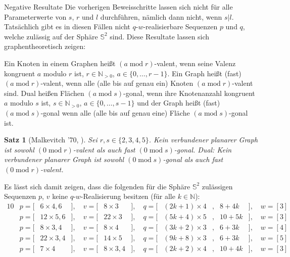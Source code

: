\documentclass[10pt, notheorems]{beamer}
\newtheorem{theorem}{Satz}[section]
\newcommand{\set}[1]{\{ #1 \}}
\newcommand{\nats}{\mathbb{N}}
\newcommand{\sphere}{\mathbb{S}}
\renewcommand{\mod}{\operatorname{mod}}
\newcommand{\hdef}[1]{\textcolor{darkred2}{#1}}
\begin{document}
\begin{frame}{Negative Resultate}
  Die vorherigen Beweisschritte lassen sich nicht für alle Parameterwerte von $s$, $r$ und $l$ durchführen, nämlich dann nicht, wenn $s | l$. Tatsächlich gibt es in diesen Fällen nicht $q$-$w$-realisierbare Sequenzen $p$ und $q$, welche zulässig auf der Sphäre $\sphere^2$ sind. Diese Resultate lassen sich graphentheoretisch zeigen:

  \begin{definition} Ein Knoten in einem Graphen heißt \hdef{$(a \mod r)$-valent}, wenn seine Valenz kongruent $a$ modulo $r$ ist, $r \in \nats_{>0}$, $a \in \set{0, \dots, r - 1}$. Ein Graph heißt (fast) $(a \mod r)$-valent, wenn alle (alle bis auf genau ein) Knoten $(a \mod r)$-valent sind. Dual heißen Flächen \hdef{$(a \mod s)$-gonal}, wenn ihre Knotenanzahl kongruent $a$ modulo $s$ ist, $s \in \nats_{>0}$, $a \in \set{0, \dots, s - 1}$ und der Graph heißt (fast) $(a \mod s)$-gonal wenn alle (alle bis auf genau eine) Fläche  $(a \mod s)$-gonal ist.
  \end{definition}
  
  \begin{theorem}[Malkevitch '70, \cite{malkevitch1970properties}] Sei $r, s \in \set{2, 3, 4, 5}$. Kein verbundener planarer Graph ist sowohl $(0 \mod r)$-valent als auch fast $(0 \mod s)$-gonal. Dual: Kein verbundener planarer Graph ist sowohl $(0 \mod s)$-gonal als auch fast $(0 \mod r)$-valent.
  \end{theorem}
\end{frame}

\begin{frame}
  \begin{example}
    Es lässt sich damit zeigen, dass die folgenden für die Sphäre $\sphere^2$ zulässigen Sequenzen $p$, $v$ keine $q$-$w$-Realisierung besitzen (für alle $k \in \nats$):
    \begin{alignat*}{10}
      &p = [& 6 \times 4, 6&], \quad v = [& 8 \times 3   &], \quad q = [&(2k + 1) \times 4&,{} & 8 + 4k&], \quad w = [3]\\
      &p = [&12 \times 5, 6&], \quad v = [&22 \times 3   &], \quad q = [&(5k + 4) \times 5&,{} &10 + 5k&], \quad w = [3]\\
      &p = [& 8 \times 3, 4&], \quad v = [& 8 \times 4   &], \quad q = [&(3k + 2) \times 3&,{} & 6 + 3k&], \quad w = [4]\\
      &p = [&22 \times 3, 4&], \quad v = [&14 \times 5   &], \quad q = [&(9k + 8) \times 3&,{} & 6 + 3k&], \quad w = [5]\\
      &p = [& 7 \times 4   &], \quad v = [& 8 \times 3, 4&], \quad q = [&(2k + 2) \times 4&,{} &10 + 4k&], \quad w = [3]
    \end{alignat*}
    
  \end{example}
\end{frame}
\end{document}
